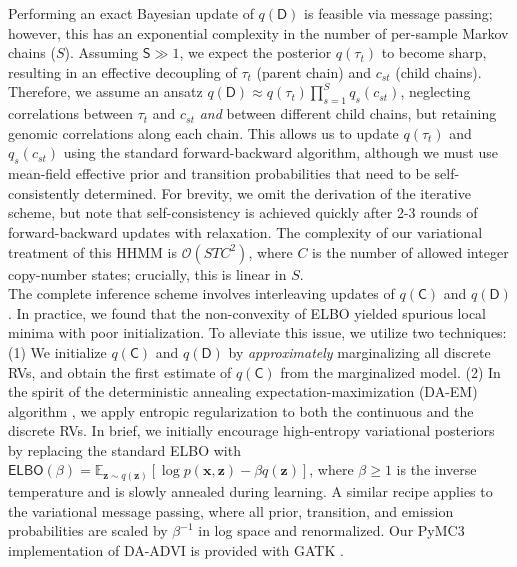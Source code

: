 \documentclass[sigplan]{acmart}\settopmatter{printfolios=true,printccs=false,printacmref=false}
\begin{document}
 Performing an exact Bayesian update of $q(\mathsf{D})$ is feasible via message passing; however, this has an exponential complexity in the number of per-sample Markov chains ($S$). Assuming $\mathsf{S} \gg 1$, we expect the posterior $q(\tau_t)$ to become sharp, resulting in an effective decoupling of $\tau_t$ (parent chain) and $c_{st}$ (child chains). Therefore, we assume an ansatz $q(\mathsf{D}) \approx q(\tau_t) \prod_{s=1}^S q_s(c_{st})$, neglecting correlations between $\tau_t$ and $c_{st}$ {\em and} between different child chains, but retaining genomic correlations along each chain. This allows us to update $q(\tau_t)$ and $q_s(c_{st})$ using the standard forward-backward algorithm, although we must use mean-field effective prior and transition probabilities that need to be self-consistently determined.  For brevity, we omit the derivation of the iterative scheme, but note that self-consistency is achieved quickly after 2-3 rounds of forward-backward updates with relaxation.  The complexity of our variational treatment of this HHMM is $\mathcal{O}(S T C^2)$, where $C$ is the number of allowed integer copy-number states; crucially, this is linear in $S$.\\

 The complete inference scheme involves interleaving updates of $q(\mathsf{C})$ and $q(\mathsf{D})$. In practice, we found that the non-convexity of ELBO yielded spurious local minima with poor initialization. To alleviate this issue, we utilize two techniques: (1) We initialize $q(\mathsf{C})$ and $q(\mathsf{D})$ by {\em approximately} marginalizing all discrete RVs, and obtain the first estimate of $q(\mathsf{C})$ from the marginalized model. (2) In the spirit of the deterministic annealing expectation-maximization (DA-EM) algorithm \cite{ueda_deterministic_1998}, we apply entropic regularization to both the continuous and the discrete RVs. In brief, we initially encourage high-entropy variational posteriors by replacing the standard ELBO with $\mathsf{ELBO}(\beta) = \mathbb{E}_{\mathbf{z} \sim q(\mathbf{z})}[\log p(\mathbf{x}, \mathbf{z}) - \beta q(\mathbf{z})]$, where $\beta \geq 1$ is the inverse temperature and is slowly annealed during learning. A similar recipe applies to the variational message passing, where all prior, transition, and emission probabilities are scaled by $\beta^{-1}$ in log space and renormalized. Our PyMC3 implementation of DA-ADVI is provided with GATK \cite{mckenna_genome_2010}.
\end{document}
